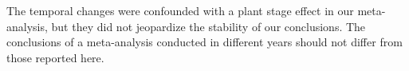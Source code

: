 \documentclass[a4paper,11pt]{article}
\begin{document}
\begin{appendices}
The temporal changes were confounded with a plant stage effect in our meta-analysis, but they did not jeopardize the stability of our conclusions. The conclusions of a meta-analysis conducted in different years should not differ from those reported here.


\end{appendices}
\end{document}

